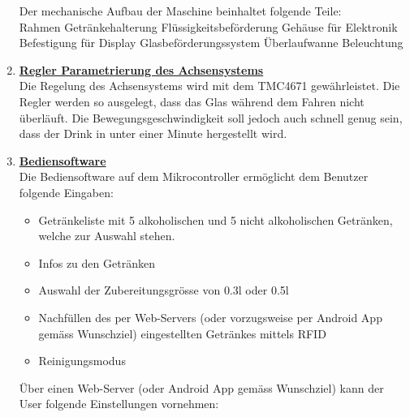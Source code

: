 \begin{enumerate}
Der mechanische Aufbau der Maschine beinhaltet folgende Teile: \\

\textbullet Rahmen \newline
\textbullet Getränkehalterung \newline
\textbullet Flüssigkeitsbeförderung \newline
\textbullet Gehäuse für Elektronik \newline
\textbullet Befestigung für Display \newline
\textbullet Glasbeförderungssystem \newline
\textbullet Überlaufwanne \newline
\textbullet Beleuchtung\\
\newpage

\item \underline{\textbf{Regler Parametrierung des Achsensystems}}\mbox{}\\

Die Regelung des Achsensystems wird mit dem TMC4671 gewährleistet. Die Regler werden so ausgelegt, dass das Glas während dem Fahren nicht überläuft. Die Bewegungsgeschwindigkeit soll jedoch auch schnell genug sein, dass der Drink in unter einer Minute hergestellt wird.\\

\item \underline{\textbf{Bediensoftware}}\mbox{}\\

Die Bediensoftware auf dem Mikrocontroller ermöglicht dem Benutzer folgende Eingaben:\\
\begin{itemize}

\item Getränkeliste mit 5 alkoholischen und 5 nicht alkoholischen Getränken, welche zur Auswahl stehen.
\item Infos zu den Getränken
\item Auswahl der Zubereitungsgrösse von 0.3l oder 0.5l
\item Nachfüllen des per Web-Servers (oder vorzugsweise per Android App gemäss Wunschziel) eingestellten Getränkes mittels RFID
\item Reinigungsmodus\\
\end{itemize}

Über einen Web-Server (oder Android App gemäss Wunschziel) kann der User folgende Einstellungen vornehmen: \\


\end{enumerate}
